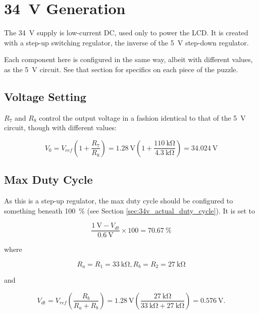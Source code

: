 \documentclass{article}
\begin{document}
\section{\qty{34}{\volt} Generation}
The \qty{34}{\volt} supply is low-current DC, used only to power the
LCD. It is created with a step-up switching regulator, the inverse of
the \qty{5}{\volt} step-down regulator.

Each component here is configured in the same way, albeit with
different values, as the \qty{5}{\volt} circuit. See that section for
specifics on each piece of the puzzle.

\subsection{Voltage Setting}
$R_7$ and $R_8$ control the output voltage in a fashion identical to
that of the \qty{5}{\volt} circuit, though with different values:

\begin{displaymath}
  V_0 = V_{ref}\left(1+\frac{R_7}{R_8}\right) =
  \qty{1.28}{\volt}\left(1+\frac{\qty{110}{\kilo\ohm}}{\qty{4.3}{\kilo\ohm}}\right)
  = \qty{34.024}{\volt}
\end{displaymath}

\subsection{Max Duty Cycle}
As this is a step-up regulator, the max duty cycle should be
configured to something beneath \qty{100}{\%} (see Section
\ref{sec:34v_actual_duty_cycle}). It is set to

\begin{displaymath}
  \frac{\qty{1}{\volt} - V_{dt}}{\qty{0.6}{\volt}} \times{} 100 = \qty{70.67}{\%}
\end{displaymath}

\noindent
where

\begin{displaymath}
  R_a = R_1 = \qty{33}{\kilo\ohm},R_b = R_2 = \qty{27}{\kilo\ohm}
\end{displaymath}

\noindent
and

\begin{displaymath}
  V_{dt} =  V_{ref}\left(\frac{R_b}{R_a+R_b}\right) =
  \qty{1.28}{\volt}\left(\frac{\qty{27}{\kilo\ohm}}{\qty{33}{\kilo\ohm} +
      \qty{27}{\kilo\ohm}}\right) = \qty{0.576}{\volt}.
\end{displaymath}
\end{document}
